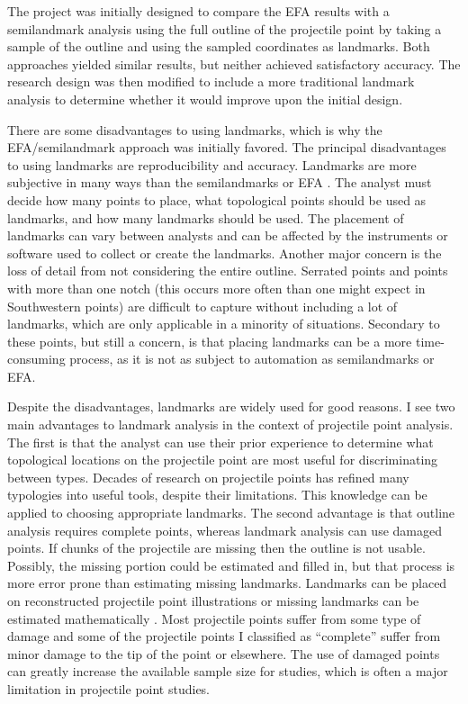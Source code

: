 \documentclass[a4paper]{article}
\begin{document}
The project was initially designed to compare the EFA results with a semilandmark analysis using the full outline of the projectile point by taking a sample of the outline and using the sampled coordinates as landmarks. Both approaches yielded similar results, but neither achieved satisfactory accuracy. The research design was then modified to include a more traditional landmark analysis to determine whether it would improve upon the initial design.

There are some disadvantages to using landmarks, which is why the EFA/semilandmark approach was initially favored. The principal disadvantages to using landmarks are reproducibility and accuracy. Landmarks are more subjective in many ways than the semilandmarks or EFA \autocite[see][205]{Shott2010-fn}. The analyst must decide how many points to place, what topological points should be used as landmarks, and how many landmarks should be used. The placement of landmarks can vary between analysts and can be affected by the instruments or software used to collect or create the landmarks. Another major concern is the loss of detail from not considering the entire outline. Serrated points and points with more than one notch (this occurs more often than one might expect in Southwestern points) are difficult to capture without including a lot of landmarks, which are only applicable in a minority of situations. Secondary to these points, but still a concern, is that placing landmarks can be a more time-consuming process, as it is not as subject to automation as semilandmarks or EFA.

Despite the disadvantages, landmarks are widely used for good reasons. I see two main advantages to landmark analysis in the context of projectile point analysis. The first is that the analyst can use their prior experience to determine what topological locations on the projectile point are most useful for discriminating between types. Decades of research on projectile points has refined many typologies into useful tools, despite their limitations. This knowledge can be applied to choosing appropriate landmarks. The second advantage is that outline analysis requires complete points, whereas landmark analysis can use damaged points. If chunks of the projectile are missing then the outline is not usable. Possibly, the missing portion could be estimated and filled in, but that process is more error prone than estimating missing landmarks. Landmarks can be placed on reconstructed projectile point illustrations or missing landmarks can be estimated mathematically \autocite{Gunz2009-yb}. Most projectile points suffer from some type of damage and some of the projectile points I classified as ``complete'' suffer from minor damage to the tip of the point or elsewhere. The use of damaged points can greatly increase the available sample size for studies, which is often a major limitation in projectile point studies.
\end{document}
